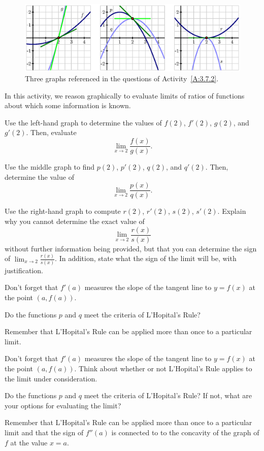 \begin{figure}
\begin{flushleft}
\includegraphics{figures/2_8_Act2.eps}
\caption{Three graphs referenced in the questions of Activity~\ref{A:3.7.2}.} \label{F:2.8.Act2}
\end{flushleft}
\end{figure}

\begin{activity} \label{A:3.7.2}  
In this activity, we reason graphically to evaluate limits of ratios of functions about which some information is known.

\ba
	\item Use the left-hand graph to determine the values of $f(2)$, $f'(2)$, $g(2)$, and $g'(2)$.  Then, evaluate 
	$$\lim_{x \to 2} \frac{f(x)}{g(x)}.$$
	\item Use the middle graph to find $p(2)$, $p'(2)$, $q(2)$, and $q'(2)$.  Then, determine the value of
	$$\lim_{x \to 2} \frac{p(x)}{q(x)}.$$
	\item Use the right-hand graph to compute $r(2)$, $r'(2)$, $s(2)$, $s'(2)$.  Explain why you cannot determine the exact value of 
	$$\lim_{x \to 2} \frac{r(x)}{s(x)}$$
	without further information being provided, but that you can determine the sign of $\lim_{x \to 2} \frac{r(x)}{s(x)}$.  In addition, state what the sign of the limit will be, with justification.
\ea
\end{activity}
\begin{smallhint}
\ba
	\item Don't forget that $f'(a)$ measures the slope of the tangent line to $y = f(x)$ at the point $(a,f(a))$.
	\item Do the functions $p$ and $q$ meet the criteria of L'Hopital's Rule?
	\item Remember that L'Hopital's Rule can be applied more than once to a particular limit.
\ea
\end{smallhint}
\begin{bighint}
\ba
	\item Don't forget that $f'(a)$ measures the slope of the tangent line to $y = f(x)$ at the point $(a,f(a))$.  Think about whether or not L'Hopital's Rule applies to the limit under consideration.
	\item Do the functions $p$ and $q$ meet the criteria of L'Hopital's Rule?  If not, what are your options for evaluating the limit?
	\item Remember that L'Hopital's Rule can be applied more than once to a particular limit and that the sign of $f''(a)$ is connected to to the concavity of the graph of $f$ at the value $x = a$.
\ea
\end{bighint}
